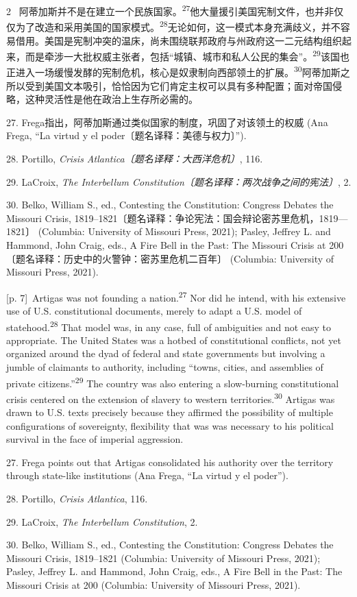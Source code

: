\documentclass[10pt,a4paper]{article}
\begin{document}
\begin{paracol}{2}
\switchcolumn*
{\scriptsize\color{gray} [p. 7]}\ 阿蒂加斯并不是在建立一个民族国\mbox{家。\textsuperscript{27}}他大量援引美国宪制文件，也并非仅仅为了改造和采用美国的国家模\mbox{式。\textsuperscript{28}}无论如何，这一模式本身充满歧义，并不容易借用。美国是宪制冲突的温床，尚未围绕联邦政府与州政府这一二元结构组织起来，而是牵涉一大批权威主张者，包括“城镇、城市和私人公民的集会”。\nobreak\textsuperscript{29}该国也正进入一场缓慢发酵的宪制危机，核心是奴隶制向西部领土的扩\mbox{展。\textsuperscript{30}}阿蒂加斯之所以受到美国文本吸引，恰恰因为它们肯定主权可以具有多种配置；面对帝国侵略，这种灵活性是他在政治上生存所必需的。\par{\small 27. Frega指出，阿蒂加斯通过类似国家的制度，巩固了对该领土的权威 (Ana Frega, “La virtud y el poder〔题名译释：美德与权力〕”).\par}{\small 28. Portillo, \textit{Crisis Atlantica〔题名译释：大西洋危机〕}, 116.\par}{\small 29. LaCroix, \textit{The Interbellum Constitution〔题名译释：两次战争之间的宪法〕}, 2.\par}{\small 30. Belko, William S., ed., Contesting the Constitution: Congress Debates the Missouri Crisis, 1819–1821〔题名译释：争论宪法：国会辩论密苏里危机，1819—1821〕 (Columbia: University of Missouri Press, 2021); Pasley, Jeffrey L. and Hammond, John Craig, eds., A Fire Bell in the Past: The Missouri Crisis at 200〔题名译释：历史中的火警钟：密苏里危机二百年〕 (Columbia: University of Missouri Press, 2021).\par}
\switchcolumn
{\scriptsize\color{gray} [p. 7]}\ Artigas was not founding a nation.\nobreak\textsuperscript{27} Nor did he intend, with his extensive use of U.S. constitutional documents, merely to adapt a U.S. model of statehood.\nobreak\textsuperscript{28} That model was, in any case, full of ambiguities and not easy to appropriate. The United States was a hotbed of constitutional conflicts, not yet organized around the dyad of federal and state governments but involving a jumble of claimants to authority, including “towns, cities, and assemblies of private citizens.”\nobreak\textsuperscript{29} The country was also entering a slow-burning constitutional crisis centered on the extension of slavery to western territories.\nobreak\textsuperscript{30} Artigas was drawn to U.S. texts precisely because they affirmed the possibility of multiple configurations of sovereignty, flexibility that was was necessary to his political survival in the face of imperial aggression.\par{\small 27. Frega points out that Artigas consolidated his authority over the territory through state-like institutions (Ana Frega, “La virtud y el poder”).\par}{\small 28. Portillo, \textit{Crisis Atlantica}, 116.\par}{\small 29. LaCroix, \textit{The Interbellum Constitution}, 2.\par}{\small 30. Belko, William S., ed., Contesting the Constitution: Congress Debates the Missouri Crisis, 1819–1821 (Columbia: University of Missouri Press, 2021); Pasley, Jeffrey L. and Hammond, John Craig, eds., A Fire Bell in the Past: The Missouri Crisis at 200 (Columbia: University of Missouri Press, 2021).\par}

\end{paracol}
\end{document}
